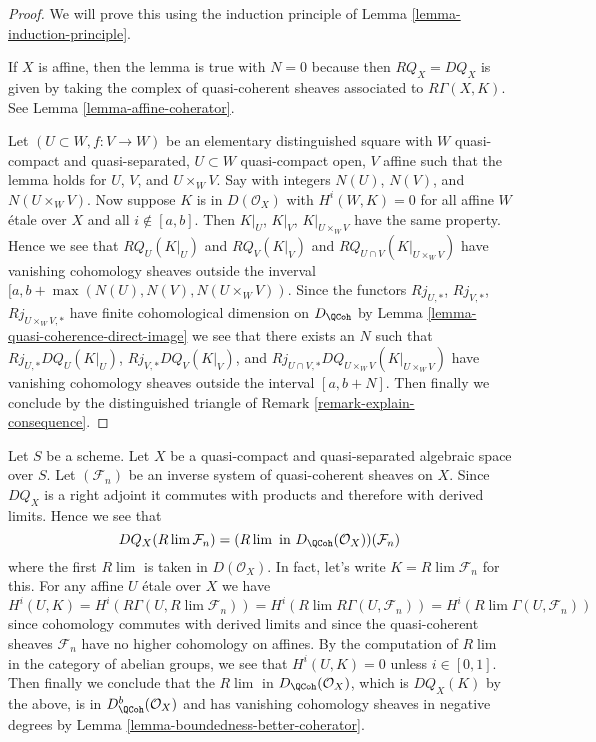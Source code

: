 \begin{proof}
We will prove this using the induction principle of
Lemma \ref{lemma-induction-principle}.

\medskip\noindent
If $X$ is affine, then the lemma is true with $N = 0$ because then
$RQ_X = DQ_X$ is given by taking the complex of
quasi-coherent sheaves associated to $R\Gamma(X, K)$.
See Lemma \ref{lemma-affine-coherator}.

\medskip\noindent
Let $(U \subset W, f : V \to W)$ be an elementary distinguished square
with $W$ quasi-compact and quasi-separated, $U \subset W$
quasi-compact open, $V$ affine such that
the lemma holds for $U$, $V$, and $U \times_W V$.
Say with integers $N(U)$, $N(V)$, and $N(U \times_W V)$.
Now suppose $K$ is in $D(\mathcal{O}_X)$ with
$H^i(W, K) = 0$ for all affine $W$ \'etale over $X$ and all $i \not \in [a, b]$.
Then $K|_U$, $K|_V$, $K|_{U \times_W V}$ have the same property.
Hence we see that $RQ_U(K|_U)$ and $RQ_V(K|_V)$ and
$RQ_{U \cap V}(K|_{U \times_W V})$ have vanishing cohomology
sheaves outside the inverval $[a, b + \max(N(U), N(V), N(U \times_W V))$.
Since the functors $Rj_{U, *}$, $Rj_{V, *}$, $Rj_{U \times_W V, *}$
have finite cohomological dimension on $D_\QCoh$ by
Lemma \ref{lemma-quasi-coherence-direct-image}
we see that there exists an $N$ such that
$Rj_{U, *}DQ_U(K|_U)$, $Rj_{V, *}DQ_V(K|_V)$, and
$Rj_{U \cap V, *}DQ_{U \times_W V}(K|_{U \times_W V})$ have vanishing
cohomology sheaves outside the interval $[a, b + N]$.
Then finally we conclude by the distinguished triangle
of Remark \ref{remark-explain-consequence}.
\end{proof}

\begin{example}
\label{example-inverse-limit-quasi-coherent}
Let $S$ be a scheme.
Let $X$ be a quasi-compact and quasi-separated algebraic space over $S$.
Let $(\mathcal{F}_n)$
be an inverse system of quasi-coherent sheaves on $X$.
Since $DQ_X$ is a right
adjoint it commutes with products and therefore with derived limits.
Hence we see that
$$
DQ_X(R\lim \mathcal{F}_n) =
(R\lim\text{ in }D_\QCoh(\mathcal{O}_X))(\mathcal{F}_n)
$$
where the first $R\lim$ is taken in $D(\mathcal{O}_X)$.
In fact, let's write $K = R\lim \mathcal{F}_n$ for this.
For any affine $U$ \'etale over $X$ we have
$$
H^i(U, K) =
H^i(R\Gamma(U, R\lim \mathcal{F}_n)) =
H^i(R\lim R\Gamma(U, \mathcal{F}_n)) =
H^i(R\lim \Gamma(U, \mathcal{F}_n))
$$
since cohomology commutes with derived limits and since
the quasi-coherent sheaves
$\mathcal{F}_n$ have no higher cohomology on affines.
By the computation of $R\lim$ in the category of
abelian groups, we see that $H^i(U, K) = 0$
unless $i \in [0, 1]$. Then finally we conclude that
the $R\lim$ in $D_\QCoh(\mathcal{O}_X)$, which is
$DQ_X(K)$ by the above, is in $D^b_\QCoh(\mathcal{O}_X)$
and has vanishing cohomology sheaves in negative degrees
by Lemma \ref{lemma-boundedness-better-coherator}.
\end{example}










